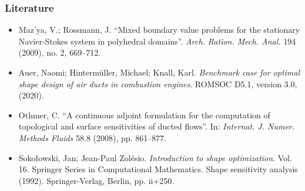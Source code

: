 \documentclass[10pt,xcolor=table,english]{beamer}   %
\begin{document}
\begin{frame}
    \frametitle{Literature}
    \begin{itemize}
        \item Maz'ya, V.; Rossmann, J. ``Mixed boundary value problems for the stationary Navier-Stokes system in polyhedral domains''. \textit{Arch. Ration. Mech. Anal.} 194 (2009), no. 2, 669--712.
        \item Auer, Naomi; Hinterm\"uller, Michael; Knall, Karl. \textit{Benchmark case for optimal shape design of air ducts in combustion engines}. ROMSOC D5.1, version 3.0, (2020).
        \item Othmer, C. ``A continuous adjoint formulation for the computation of topological and surface sensitivities of ducted flows''. In: \textit{Internat. J. Numer. Methods Fluids} 58.8 (2008), pp. 861--877.
        \item Soko\l owski, Jan; Jean-Paul Zol\'esio. \textit{Introduction to shape optimization}. Vol. 16. Springer Series in Computational Mathematics. Shape sensitivity analysis (1992). Springer-Verlag, Berlin, pp. ii+250.
    \end{itemize}
\end{frame}
\end{document}
